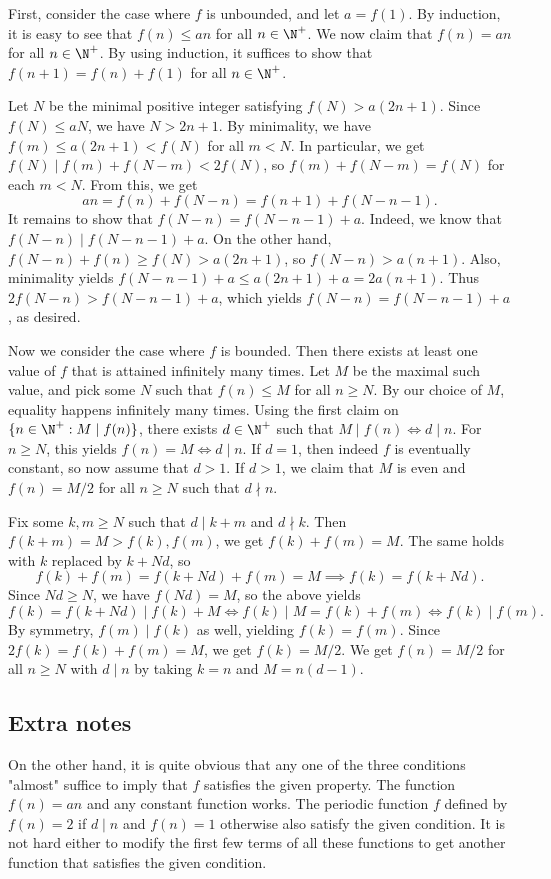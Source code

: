 First, consider the case where $f$ is unbounded, and let $a = f(1)$.
By induction, it is easy to see that $f(n) \leq an$ for all $n \in \N^+$.
We now claim that $f(n) = an$ for all $n \in \N^+$.
By using induction, it suffices to show that $f(n + 1) = f(n) + f(1)$ for all $n \in \N^+$.

Let $N$ be the minimal positive integer satisfying $f(N) > a(2n + 1)$.
Since $f(N) \leq aN$, we have $N > 2n + 1$.
By minimality, we have $f(m) \leq a(2n + 1) < f(N)$ for all $m < N$.
In particular, we get $f(N) \mid f(m) + f(N - m) < 2 f(N)$, so $f(m) + f(N - m) = f(N)$ for each $m < N$.
From this, we get
\[ an = f(n) + f(N - n) = f(n + 1) + f(N - n - 1). \]
It remains to show that $f(N - n) = f(N - n - 1) + a$.
Indeed, we know that $f(N - n) \mid f(N - n - 1) + a$.
On the other hand, $f(N - n) + f(n) \geq f(N) > a(2n + 1)$, so $f(N - n) > a(n + 1)$.
Also, minimality yields $f(N - n - 1) + a \leq a(2n + 1) + a = 2a(n + 1)$.
Thus $2 f(N - n) > f(N - n - 1) + a$, which yields $f(N - n) = f(N - n - 1) + a$, as desired.

Now we consider the case where $f$ is bounded.
Then there exists at least one value of $f$ that is attained infinitely many times.
Let $M$ be the maximal such value, and pick some $N$ such that $f(n) \leq M$ for all $n \geq N$.
By our choice of $M$, equality happens infinitely many times.
Using the first claim on $\{n \in \N^+ : M \mid f(n)\}$, there exists $d \in \N^+$ such that $M \mid f(n) \iff d \mid n$.
For $n \geq N$, this yields $f(n) = M \iff d \mid n$.
If $d = 1$, then indeed $f$ is eventually constant, so now assume that $d > 1$.
If $d > 1$, we claim that $M$ is even and $f(n) = M/2$ for all $n \geq N$ such that $d \nmid n$.

Fix some $k, m \geq N$ such that $d \mid k + m$ and $d \nmid k$.
Then $f(k + m) = M > f(k), f(m)$, we get $f(k) + f(m) = M$.
The same holds with $k$ replaced by $k + Nd$, so
\[ f(k) + f(m) = f(k + Nd) + f(m) = M \implies f(k) = f(k + Nd). \]
Since $Nd \geq N$, we have $f(Nd) = M$, so the above yields
\[ f(k) = f(k + Nd) \mid f(k) + M \iff f(k) \mid M = f(k) + f(m) \iff f(k) \mid f(m). \]
By symmetry, $f(m) \mid f(k)$ as well, yielding $f(k) = f(m)$.
Since $2 f(k) = f(k) + f(m) = M$, we get $f(k) = M/2$.
We get $f(n) = M/2$ for all $n \geq N$ with $d \mid n$ by taking $k = n$ and $M = n(d - 1)$.



\subsection*{Extra notes}

On the other hand, it is quite obvious that any one of the three conditions "almost" suffice to imply that $f$ satisfies the given property.
The function $f(n) = an$ and any constant function works.
The periodic function $f$ defined by $f(n) = 2$ if $d \mid n$ and $f(n) = 1$ otherwise also satisfy the given condition.
It is not hard either to modify the first few terms of all these functions to get another function that satisfies the given condition.
